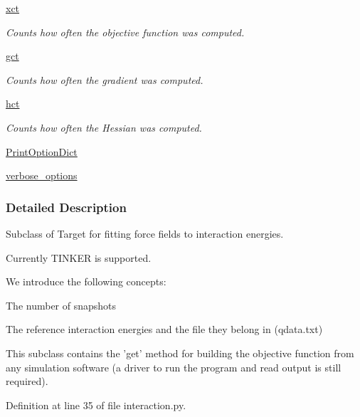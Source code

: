 \begin{DoxyCompactItemize}
\hyperlink{classforcebalance_1_1target_1_1Target_ad4cd0ab38d8fc97d3e7a6e22ce130a16}{xct}
\begin{DoxyCompactList}\small\item\em \-Counts how often the objective function was computed. \end{DoxyCompactList}\item 
\hyperlink{classforcebalance_1_1target_1_1Target_aff6e42b84dd8eb5a4dc3b47aa58bc64c}{gct}
\begin{DoxyCompactList}\small\item\em \-Counts how often the gradient was computed. \end{DoxyCompactList}\item 
\hyperlink{classforcebalance_1_1target_1_1Target_ae929918b7e695a99d7ec946d06d793e1}{hct}
\begin{DoxyCompactList}\small\item\em \-Counts how often the \-Hessian was computed. \end{DoxyCompactList}\item 
\hyperlink{classforcebalance_1_1BaseClass_afc6659278497d7245bc492ecf405ccae}{\-Print\-Option\-Dict}
\item 
\hyperlink{classforcebalance_1_1BaseClass_afd68efa29ccd2f320f4cf82198214aac}{verbose\-\_\-options}
\end{DoxyCompactItemize}


\subsubsection{\-Detailed \-Description}
\-Subclass of \-Target for fitting force fields to interaction energies. 

\-Currently \-T\-I\-N\-K\-E\-R is supported.

\-We introduce the following concepts\-:
\begin{DoxyItemize}
\item \-The number of snapshots
\item \-The reference interaction energies and the file they belong in (qdata.\-txt)
\end{DoxyItemize}

\-This subclass contains the 'get' method for building the objective function from any simulation software (a driver to run the program and read output is still required). 

\-Definition at line 35 of file interaction.\-py.



